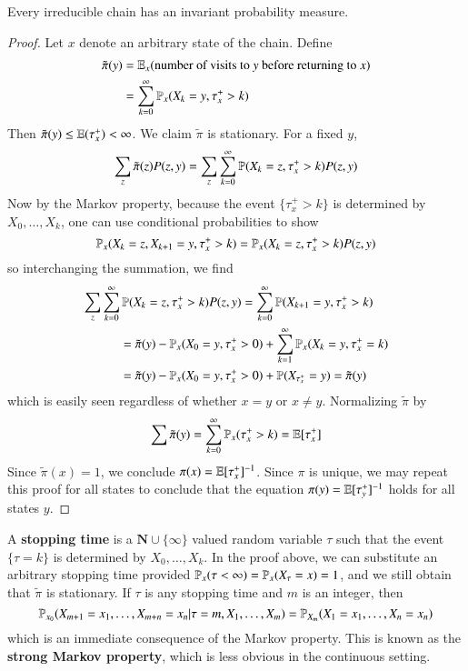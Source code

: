 \begin{theorem}
    Every irreducible chain has an invariant probability measure.
\end{theorem}
\begin{proof}
    Let $x$ denote an arbitrary state of the chain. Define
    \begin{align*}
        \tilde{\pi}(y) &= \operatorname{\mathbb{E}}_x(\text{number of visits to $y$ before returning to $x$})\\
        &= \sum_{k = 0}^\infty \operatorname{\mathbb{P}}_x(X_k = y, \tau_x^+ > k)
    \end{align*}
    Then $\tilde{\pi}(y) \leq \operatorname{\mathbb{E}}(\tau_x^+) < \infty$. We claim $\tilde{\pi}$ is stationary. For a fixed $y$,
    \[ \sum_z \tilde{\pi}(z) P(z,y) = \sum_z \sum_{k = 0}^\infty \operatorname{\mathbb{P}}(X_k = z, \tau_x^+ > k) P(z,y) \]
    Now by the Markov property, because the event $\{ \tau_x^+ > k \}$ is determined by $X_0, \dots, X_k$, one can use conditional probabilities to show
    \[ \operatorname{\mathbb{P}}_x(X_k = z, X_{k+1} = y, \tau_x^+ > k) = \operatorname{\mathbb{P}}_x(X_k = z, \tau_x^+ > k) P(z,y) \]
    so interchanging the summation, we find
    \begin{align*}
        \sum_z \sum_{k = 0}^\infty & \operatorname{\mathbb{P}}(X_k = z, \tau_x^+ > k) P(z,y) = \sum_{k = 0}^\infty \operatorname{\mathbb{P}}(X_{k+1} = y, \tau_x^+ > k)\\
        &= \tilde{\pi}(y) - \operatorname{\mathbb{P}}_x(X_0 = y, \tau_x^+ > 0) + \sum_{k = 1}^\infty \operatorname{\mathbb{P}}_x(X_k = y, \tau_x^+ = k)\\
        &= \tilde{\pi}(y) - \operatorname{\mathbb{P}}_x(X_0 = y, \tau_x^+ > 0) + \operatorname{\mathbb{P}}(X_{\tau_x^+} = y) = \tilde{\pi}(y)
    \end{align*}
    which is easily seen regardless of whether $x = y$ or $x \neq y$. Normalizing $\tilde{\pi}$ by
    \[ \sum \tilde{\pi}(y) = \sum_{k = 0}^\infty \operatorname{\mathbb{P}}_x(\tau_x^+ > k) = \operatorname{\mathbb{E}}[\tau_x^+] \]
    Since $\tilde{\pi}(x) = 1$, we conclude $\pi(x) = \operatorname{\mathbb{E}}[\tau_x^+]^{-1}$. Since $\pi$ is unique, we may repeat this proof for all states to conclude that the equation $\pi(y) = \operatorname{\mathbb{E}}[\tau_y^+]^{-1}$ holds for all states $y$.
\end{proof}

A {\bf stopping time} is a $\mathbf{N} \cup \{ \infty \}$ valued random variable $\tau$ such that the event $\{ \tau = k \}$ is determined by $X_0, \dots, X_k$. In the proof above, we can substitute an arbitrary stopping time provided $\operatorname{\mathbb{P}}_x(\tau < \infty) = \operatorname{\mathbb{P}}_x(X_\tau = x) = 1$, and we still obtain that $\tilde{\pi}$ is stationary. If $\tau$ is any stopping time and $m$ is an integer, then
%
\[ \operatorname{\mathbb{P}}_{x_0}(X_{m + 1} = x_1, \dots, X_{m + n} = x_n | \tau = m, X_1, \dots, X_m) = \operatorname{\mathbb{P}}_{X_m}(X_1 = x_1, \dots, X_n = x_n) \]
%
which is an immediate consequence of the Markov property. This is known as the {\bf strong Markov property}, which is less obvious in the continuous setting.

